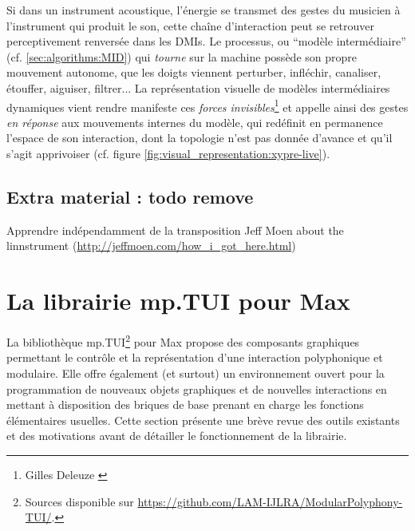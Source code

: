 \noindent Si dans un instrument acoustique, l'énergie se transmet des gestes du musicien à l'instrument qui produit le son, cette chaîne d'interaction peut se retrouver perceptivement renversée dans les \glspl{DMI}. Le processus, ou ``modèle intermédiaire'' (cf. \ref{sec:algorithms:MID}) qui \textit{tourne} sur la machine possède son propre mouvement autonome, que les doigts viennent perturber, infléchir, canaliser, étouffer, aiguiser, filtrer... La représentation visuelle de modèles intermédiaires dynamiques vient rendre manifeste ces \textit{forces invisibles}\footnote{ Gilles Deleuze \cite{deleuze_francis_1981}} et appelle ainsi des gestes \textit{en réponse} aux mouvements internes du modèle, qui redéfinit en permanence l'espace de son interaction, dont la topologie n'est pas donnée d'avance et qu'il s'agit apprivoiser (cf. figure \ref{fig:visual_representation:xypre-live}).


\subsection*{Extra material : todo remove}

Apprendre indépendamment de la transposition
 Jeff Moen about the linnstrument (\url{http://jeffmoen.com/how_i_got_here.html})

\section{La librairie mp.TUI pour Max}


\noindent La bibliothèque mp.TUI\footnote{Sources disponible sur \url{https://github.com/LAM-IJLRA/ModularPolyphony-TUI/}.} pour Max propose des composants graphiques permettant le contrôle et la représentation d'une interaction polyphonique et modulaire. Elle offre également (et surtout) un environnement ouvert pour la programmation de nouveaux objets graphiques et de nouvelles interactions en mettant à disposition des briques de base prenant en charge les fonctions élémentaires usuelles. Cette section présente une brève revue des outils existants et des motivations avant de détailler le fonctionnement de la librairie.

